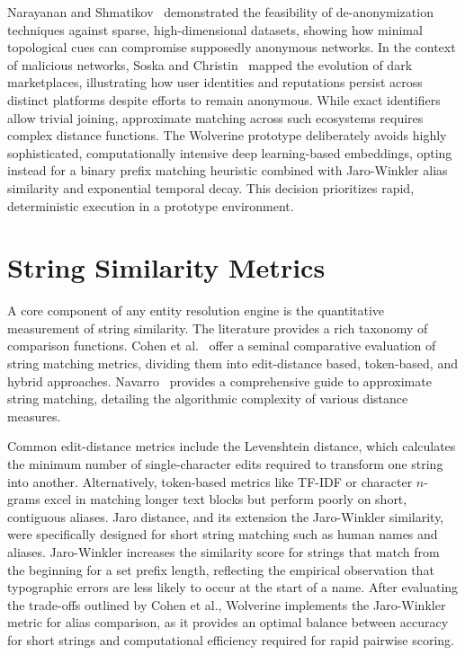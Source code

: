 Narayanan and Shmatikov~\cite{narayanan2008robust} demonstrated the feasibility of de-anonymization techniques against sparse, high-dimensional datasets, showing how minimal topological cues can compromise supposedly anonymous networks. In the context of malicious networks, Soska and Christin~\cite{soska2015measuring} mapped the evolution of dark marketplaces, illustrating how user identities and reputations persist across distinct platforms despite efforts to remain anonymous. While exact identifiers allow trivial joining, approximate matching across such ecosystems requires complex distance functions. The Wolverine prototype deliberately avoids highly sophisticated, computationally intensive deep learning-based embeddings, opting instead for a binary prefix matching heuristic combined with Jaro-Winkler alias similarity and exponential temporal decay. This decision prioritizes rapid, deterministic execution in a prototype environment.

\section{String Similarity Metrics}
\label{sec:related-string-similarity}
A core component of any entity resolution engine is the quantitative measurement of string similarity. The literature provides a rich taxonomy of comparison functions. Cohen et al.~\cite{cohen2003comparison} offer a seminal comparative evaluation of string matching metrics, dividing them into edit-distance based, token-based, and hybrid approaches. Navarro~\cite{navarro2001guided} provides a comprehensive guide to approximate string matching, detailing the algorithmic complexity of various distance measures.

Common edit-distance metrics include the Levenshtein distance, which calculates the minimum number of single-character edits required to transform one string into another. Alternatively, token-based metrics like TF-IDF or character $n$-grams excel in matching longer text blocks but perform poorly on short, contiguous aliases. Jaro distance, and its extension the Jaro-Winkler similarity, were specifically designed for short string matching such as human names and aliases. Jaro-Winkler increases the similarity score for strings that match from the beginning for a set prefix length, reflecting the empirical observation that typographic errors are less likely to occur at the start of a name. After evaluating the trade-offs outlined by Cohen et al., Wolverine implements the Jaro-Winkler metric for alias comparison, as it provides an optimal balance between accuracy for short strings and computational efficiency required for rapid pairwise scoring.

